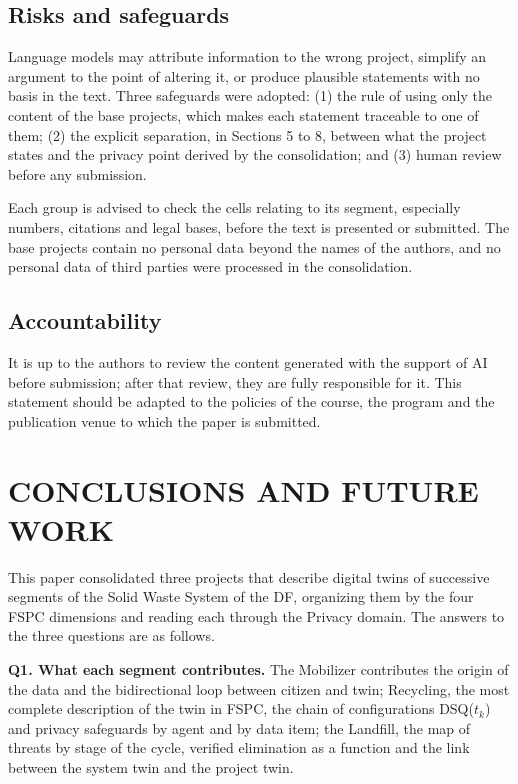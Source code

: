 \documentclass[12pt,a4paper,article,oneside,brazil,english]{abntex2}
\newcommand{\dsq}[1]{DSQ($t_{#1}$)}
\begin{document}
\subsection{Risks and safeguards}

Language models may attribute information to the wrong project, simplify an argument to the point of altering it, or produce plausible statements with no basis in the text. Three safeguards were adopted: (1) the rule of using only the content of the base projects, which makes each statement traceable to one of them; (2) the explicit separation, in Sections 5 to 8, between what the project states and the privacy point derived by the consolidation; and (3) human review before any submission.

Each group is advised to check the cells relating to its segment, especially numbers, citations and legal bases, before the text is presented or submitted. The base projects contain no personal data beyond the names of the authors, and no personal data of third parties were processed in the consolidation.

\subsection{Accountability}

It is up to the authors to review the content generated with the support of AI before submission; after that review, they are fully responsible for it. This statement should be adapted to the policies of the course, the program and the publication venue to which the paper is submitted.

\section{CONCLUSIONS AND FUTURE WORK}

This paper consolidated three projects that describe digital twins of successive segments of the Solid Waste System of the DF, organizing them by the four FSPC dimensions and reading each through the Privacy domain. The answers to the three questions are as follows.

\textbf{Q1. What each segment contributes.} The Mobilizer contributes the origin of the data and the bidirectional loop between citizen and twin; Recycling, the most complete description of the twin in FSPC, the chain of configurations \dsq{k} and privacy safeguards by agent and by data item; the Landfill, the map of threats by stage of the cycle, verified elimination as a function and the link between the system twin and the project twin.
\end{document}

